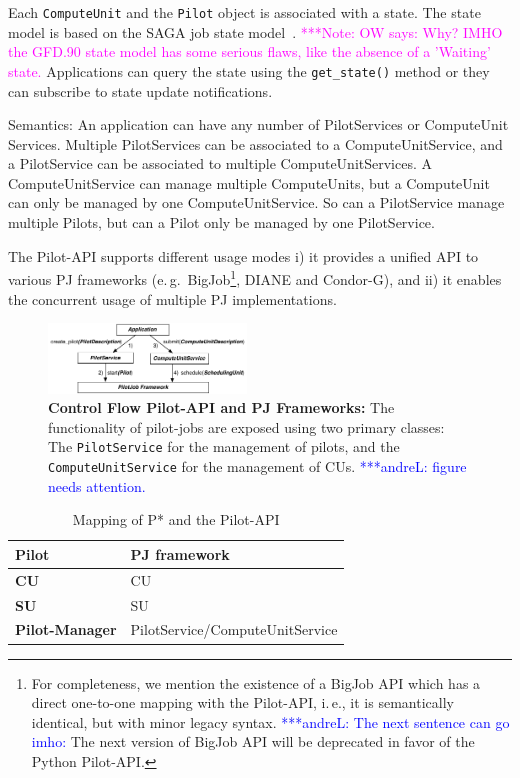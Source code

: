 \documentclass[conference,final]{IEEEtran}
\newcommand{\alnote}[1]{ {\textcolor{blue} { ***andreL: #1 }}}
\newcommand{\note}[1]{ {\textcolor{magenta} { ***Note: #1 }}}
\newcommand{\alnote}[1]{}
\newcommand{\note}[1]{}
\newcommand{\cu}{CU\xspace}
\newcommand{\cus}{CUs\xspace}
\newcommand{\upp}{\vspace*{-0.5em}}
\begin{document}
Each \texttt{ComputeUnit} and the \texttt{Pilot} object is associated with a
state. The state model is based on the SAGA job state
model~\cite{ogf-gfd-90}.
\note{OW says: Why? IMHO the GFD.90 state model has some serious flaws, like
the absence of a 'Waiting' state.} 
Applications can query the state using the \texttt{get\_state()} method or they
can subscribe to state update notifications.

Semantics:
An application can have any number of PilotServices or ComputeUnit Services.
Multiple PilotServices can be associated to a ComputeUnitService, and a
PilotService can be associated to multiple ComputeUnitServices. A
ComputeUnitService can manage multiple ComputeUnits, but a ComputeUnit can only
be managed by one ComputeUnitService. So can a PilotService manage
multiple Pilots, but can a Pilot only be managed by one PilotService.

The Pilot-API supports different usage modes i) it provides a unified
API to various PJ frameworks (e.\,g.\ BigJob\footnote{For
  completeness, we mention the existence of a BigJob API which has a
  direct one-to-one mapping with the Pilot-API, i.\,e., it is
  semantically identical, but with minor legacy syntax. \alnote{The next 
  sentence can go imho:} The next
  version of BigJob API will be deprecated in favor of the Python
  Pilot-API.}, DIANE and Condor-G), and ii) it enables the concurrent
usage of multiple PJ implementations.

\begin{figure}[t]
	\centering
		\includegraphics[width=0.47\textwidth]{figures/pilot-api-flow.pdf}
	\caption{\textbf{Control Flow Pilot-API and PJ Frameworks:} The functionality    of pilot-jobs are exposed 
	using two primary classes: The \texttt{PilotService} for the management 
	of pilots, and the \texttt{ComputeUnitService} for the management of \cus.
    \alnote{figure needs attention.}
	}
	\label{fig:figures_pilot_api_flow}
\end{figure}

\begin{table}[t]
	\centering
\begin{tabular}{|l|l|}
\hline
\textbf{Pilot} &PJ framework\\
\hline
\textbf{\cu } &\cu \\
\hline
\textbf{SU} &SU\\
\hline
\textbf{Pilot-Manager} & PilotService/ComputeUnitService\\
\hline
\end{tabular}
\caption{Mapping of P* and the Pilot-API\upp\upp}\label{table:pstar_elements}
\end{table}
\end{document}
